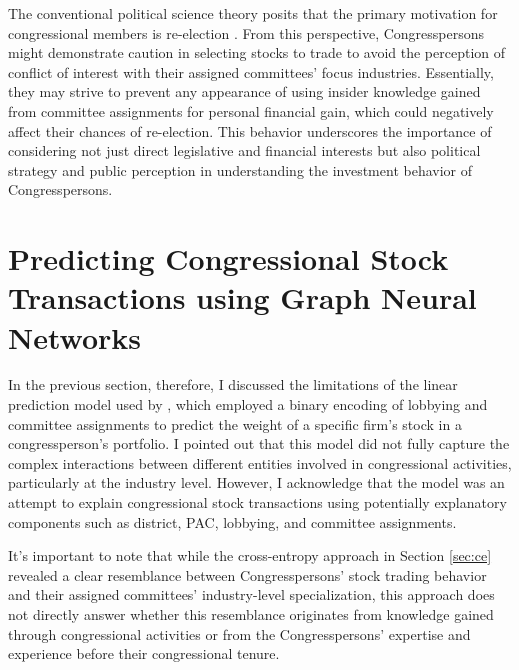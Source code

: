 \documentclass[15pt,letterpaper]{article}
\begin{document}
The conventional political science theory posits that the primary motivation for congressional members is re-election \citep{Mayhew1975CongressTE,fenno1977}. From this perspective, Congresspersons might demonstrate caution in selecting stocks to trade to avoid the perception of conflict of interest with their assigned committees' focus industries. Essentially, they may strive to prevent any appearance of using insider knowledge gained from committee assignments for personal financial gain, which could negatively affect their chances of re-election. This behavior underscores the importance of considering not just direct legislative and financial interests but also political strategy and public perception in understanding the investment behavior of Congresspersons.



\section{Predicting Congressional Stock Transactions using Graph Neural Networks}\label{sec:gnn}

In the previous section, therefore, I discussed the limitations of the linear prediction model used by \cite{eg14}, which employed a binary encoding of lobbying and committee assignments to predict the weight of a specific firm's stock in a congressperson's portfolio. I pointed out that this model did not fully capture the complex interactions between different entities involved in congressional activities, particularly at the industry level. However, I acknowledge that the model was an attempt to explain congressional stock transactions using potentially explanatory components such as district, PAC, lobbying, and committee assignments.

It's important to note that while the cross-entropy approach in Section \ref{sec:ce} revealed a clear resemblance between Congresspersons' stock trading behavior and their assigned committees' industry-level specialization, this approach does not directly answer whether this resemblance originates from knowledge gained through congressional activities or from the Congresspersons' expertise and experience before their congressional tenure. 
\end{document}
